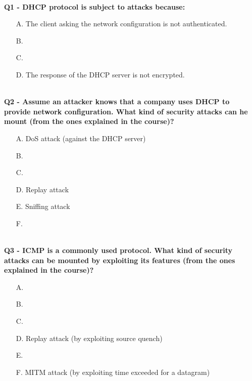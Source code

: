 \textbf{\\Q1 - DHCP protocol is subject to attacks because:}
\begin{itemize}
    \item[A.] The client asking the network configuration is not authenticated.
    \item[B.] 
    \item[C.] 
    \item[D.] The response of the DHCP server is not encrypted.
\end{itemize}

\textbf{\\Q2 - Assume an attacker knows that a company uses DHCP to provide network configuration. What kind of security attacks can he mount (from the ones explained in the course)?}
\begin{itemize}
    \item[A.] DoS attack (against the DHCP server)
    \item[B.] 
    \item[C.] 
    \item[D.] Replay attack
    \item[E.] Sniffing attack
    \item[F.] 
\end{itemize}


\textbf{\\Q3 - ICMP is a commonly used protocol. What kind of security attacks can be mounted by exploiting its features (from the ones explained in the course)?}
\begin{itemize}
    \item[A.] 
    \item[B.] 
    \item[C.] 
    \item[D.] Replay attack (by exploiting source quench)
    \item[E.] 
    \item[F.] MITM attack (by exploiting time exceeded for a datagram)
\end{itemize}

